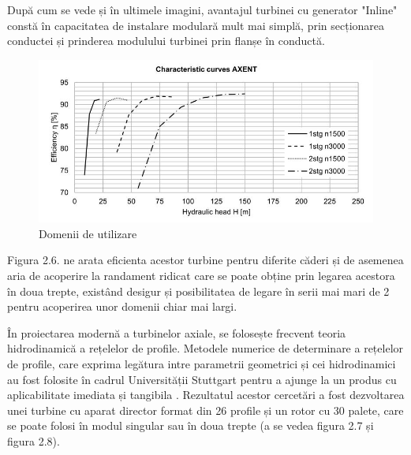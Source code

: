 După cum se vede și în ultimele imagini, avantajul turbinei cu generator "Inline" constă în capacitatea de instalare modulară mult mai simplă, prin secționarea conductei și prinderea modulului turbinei prin flanșe în conductă.

\begin{figure}[h!]
	\centering
	\includegraphics[scale=0.7]{figures/rezultate_Neipp_2014.JPG}
	\caption{Domenii de utilizare \protect\cite{neipp2017zweistufige}}
	\label{Domenii de utilizare}
\end{figure}

Figura 2.6. ne arata eficienta acestor turbine pentru diferite căderi și de asemenea aria de acoperire la randament ridicat care se poate obține prin legarea acestora în doua trepte, existând desigur și posibilitatea de legare în serii mai mari de 2 pentru acoperirea unor domenii chiar mai largi.

În proiectarea modernă a turbinelor axiale, se folosește frecvent teoria hidrodinamică a rețelelor de profile. Metodele numerice de determinare a rețelelor de profile, care exprima legătura intre parametrii geometrici și cei hidrodinamici au fost folosite în cadrul Universității Stuttgart pentru a ajunge la un produs cu aplicabilitate imediata și tangibila \cite{gentner2000experimentelle}. Rezultatul acestor cercetări a fost dezvoltarea unei turbine cu aparat director format din 26 profile și un rotor cu 30 palete, care se poate folosi în modul singular sau în doua trepte (a se vedea figura 2.7 și figura 2.8).

